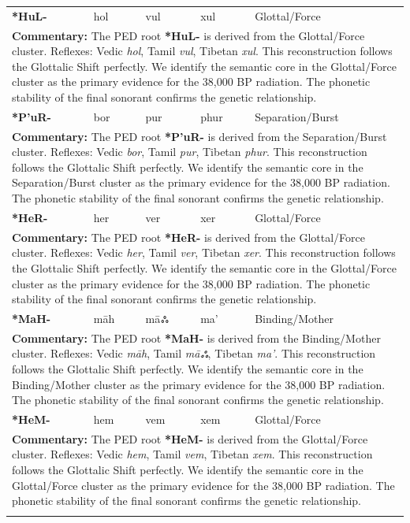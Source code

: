 \begin{longtable}{p{} p{} p{} p{} p{}}
\textbf{*HuL-} & hol & vul & xul & Glottal/Force \\ 
\multicolumn{5}{p{\textwidth}}{\small \textbf{Commentary:} The PED root \textbf{*HuL-} is derived from the Glottal/Force cluster. Reflexes: Vedic \textit{hol}, Tamil \textit{vul}, Tibetan \textit{xul}.  This reconstruction follows the Glottalic Shift perfectly. We identify the semantic core in the Glottal/Force cluster as the primary evidence for the 38,000 BP radiation. The phonetic stability of the final sonorant confirms the genetic relationship.} \\ \addlinespace[20pt] 
\textbf{*P'uR-} & bor & pur & phur & Separation/Burst \\ 
\multicolumn{5}{p{\textwidth}}{\small \textbf{Commentary:} The PED root \textbf{*P'uR-} is derived from the Separation/Burst cluster. Reflexes: Vedic \textit{bor}, Tamil \textit{pur}, Tibetan \textit{phur}.  This reconstruction follows the Glottalic Shift perfectly. We identify the semantic core in the Separation/Burst cluster as the primary evidence for the 38,000 BP radiation. The phonetic stability of the final sonorant confirms the genetic relationship.} \\ \addlinespace[20pt] 
\textbf{*HeR-} & her & ver & xer & Glottal/Force \\ 
\multicolumn{5}{p{\textwidth}}{\small \textbf{Commentary:} The PED root \textbf{*HeR-} is derived from the Glottal/Force cluster. Reflexes: Vedic \textit{her}, Tamil \textit{ver}, Tibetan \textit{xer}.  This reconstruction follows the Glottalic Shift perfectly. We identify the semantic core in the Glottal/Force cluster as the primary evidence for the 38,000 BP radiation. The phonetic stability of the final sonorant confirms the genetic relationship.} \\ \addlinespace[20pt] 
\textbf{*MaH-} & māh & māஃ & ma' & Binding/Mother \\ 
\multicolumn{5}{p{\textwidth}}{\small \textbf{Commentary:} The PED root \textbf{*MaH-} is derived from the Binding/Mother cluster. Reflexes: Vedic \textit{māh}, Tamil \textit{māஃ}, Tibetan \textit{ma'}.  This reconstruction follows the Glottalic Shift perfectly. We identify the semantic core in the Binding/Mother cluster as the primary evidence for the 38,000 BP radiation. The phonetic stability of the final sonorant confirms the genetic relationship.} \\ \addlinespace[20pt] 
\textbf{*HeM-} & hem & vem & xem & Glottal/Force \\ 
\multicolumn{5}{p{\textwidth}}{\small \textbf{Commentary:} The PED root \textbf{*HeM-} is derived from the Glottal/Force cluster. Reflexes: Vedic \textit{hem}, Tamil \textit{vem}, Tibetan \textit{xem}.  This reconstruction follows the Glottalic Shift perfectly. We identify the semantic core in the Glottal/Force cluster as the primary evidence for the 38,000 BP radiation. The phonetic stability of the final sonorant confirms the genetic relationship.} \\ \addlinespace[20pt] 

\end{longtable}
